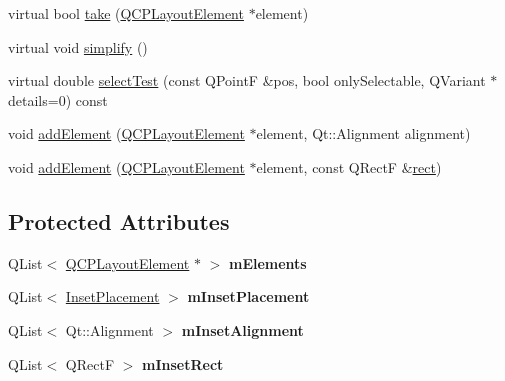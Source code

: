 \begin{DoxyCompactItemize}
\item 
virtual bool \mbox{\hyperlink{class_q_c_p_layout_inset_a9ac707ccff650633b97f52dd5cddcf49}{take}} (\mbox{\hyperlink{class_q_c_p_layout_element}{Q\+C\+P\+Layout\+Element}} $\ast$element)
\item 
virtual void \mbox{\hyperlink{class_q_c_p_layout_inset_abb9eb23bf2d7c587a8abe02d065eae0a}{simplify}} ()
\item 
virtual double \mbox{\hyperlink{class_q_c_p_layout_inset_afcd56d5d1b8853838cdc535f1904f68a}{select\+Test}} (const Q\+PointF \&pos, bool only\+Selectable, Q\+Variant $\ast$details=0) const
\item 
void \mbox{\hyperlink{class_q_c_p_layout_inset_ad61529eb576af7f04dff94abb10c745a}{add\+Element}} (\mbox{\hyperlink{class_q_c_p_layout_element}{Q\+C\+P\+Layout\+Element}} $\ast$element, Qt\+::\+Alignment alignment)
\item 
void \mbox{\hyperlink{class_q_c_p_layout_inset_a8ff61fbee4a1f0ff45c398009d9f1e56}{add\+Element}} (\mbox{\hyperlink{class_q_c_p_layout_element}{Q\+C\+P\+Layout\+Element}} $\ast$element, const Q\+RectF \&\mbox{\hyperlink{class_q_c_p_layout_element_a208effccfe2cca4a0eaf9393e60f2dd4}{rect}})
\end{DoxyCompactItemize}
\subsection*{Protected Attributes}
\begin{DoxyCompactItemize}
\item 
\mbox{\label{class_q_c_p_layout_inset_a8fff7eae9a1be9a5c1e544fb379f682f}} 
Q\+List$<$ \mbox{\hyperlink{class_q_c_p_layout_element}{Q\+C\+P\+Layout\+Element}} $\ast$ $>$ {\bfseries m\+Elements}
\item 
\mbox{\label{class_q_c_p_layout_inset_a57a0a4e445cc78eada29765ecf092abe}} 
Q\+List$<$ \mbox{\hyperlink{class_q_c_p_layout_inset_a8b9e17d9a2768293d2a7d72f5e298192}{Inset\+Placement}} $>$ {\bfseries m\+Inset\+Placement}
\item 
\mbox{\label{class_q_c_p_layout_inset_a55e9b84c310136ff985a6544184ab64a}} 
Q\+List$<$ Qt\+::\+Alignment $>$ {\bfseries m\+Inset\+Alignment}
\item 
\mbox{\label{class_q_c_p_layout_inset_aaa8f6b5029458f3d97a65239524a2b33}} 
Q\+List$<$ Q\+RectF $>$ {\bfseries m\+Inset\+Rect}
\end{DoxyCompactItemize}
